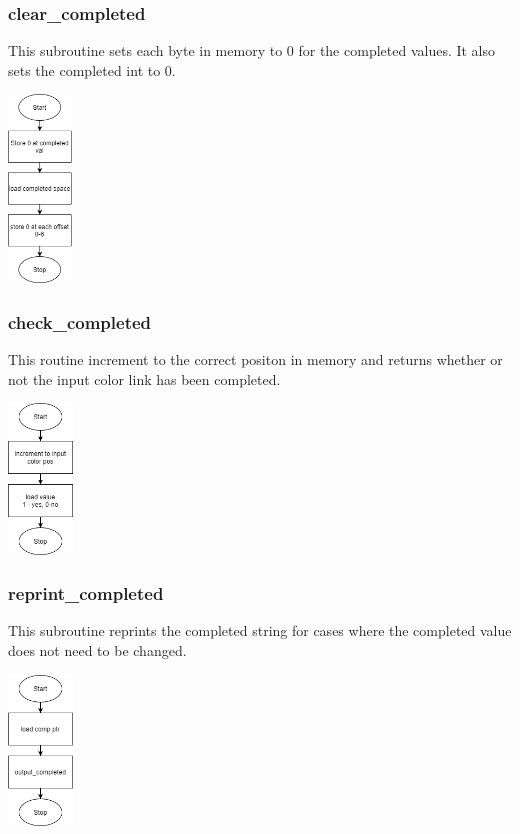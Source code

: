 \documentclass{article}
\begin{document}
    \subsubsection{clear\_completed}
    This subroutine sets each byte in memory to 0 for the completed values.
    It also sets the completed int to 0.
    \begin{center}
        {\includegraphics[height=5cm]{clear_completed.png}\centering} 
    \end{center}
    \newpage

    \subsubsection{check\_completed}
    This routine increment to the correct positon in memory
    and returns whether or not the input color link has been
    completed.
    \begin{center}
        {\includegraphics[height=4cm]{check_completed.png}\centering} 
    \end{center}

    \subsubsection{reprint\_completed}
    This subroutine reprints the completed string for cases where 
    the completed value does not need to be changed.
    \begin{center}
        {\includegraphics[height=4cm]{reprint_completed.png}\centering} 
    \end{center}
    \newpage
\end{document}
